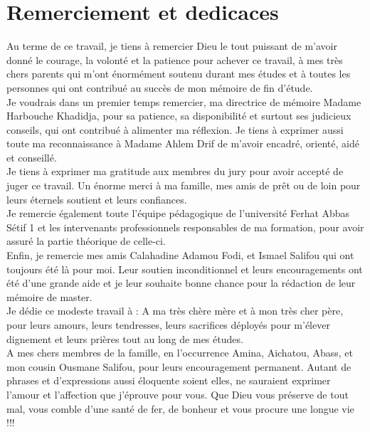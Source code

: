 \chapter*{Remerciement et dedicaces}
Au terme de ce travail, je tiens à remercier Dieu le tout puissant de m’avoir donné le courage, la volonté et la patience pour achever ce travail, à mes très chers parents qui m’ont énormément soutenu durant mes études et à toutes les personnes qui ont contribué au succès de mon mémoire de fin d’étude. \\
Je voudrais dans un premier temps remercier, ma directrice de mémoire Madame Harbouche Khadidja, pour sa patience, sa disponibilité et surtout ses judicieux conseils, qui ont contribué à alimenter ma réflexion. Je tiens à exprimer aussi toute ma reconnaissance à Madame Ahlem Drif de m’avoir encadré, orienté, aidé et conseillé. \\
Je tiens à exprimer ma gratitude aux membres du jury pour avoir accepté de juger ce travail. Un énorme merci à ma famille, mes amis de prêt ou de loin pour leurs éternels soutient et leurs confiances. \\
Je remercie également toute l’équipe pédagogique de l’université Ferhat Abbas Sétif 1 et les intervenants professionnels responsables de ma formation, pour avoir assuré la partie théorique de celle-ci. \\
Enfin, je remercie mes amis Calahadine Adamou Fodi, et Ismael Salifou qui ont toujours été là pour moi. Leur soutien inconditionnel et leurs encouragements ont été d’une grande aide et je leur souhaite bonne chance pour la rédaction de leur mémoire de master. \\
Je dédie ce modeste travail à :
A ma très chère mère et à mon très cher père, pour leurs amours, leurs tendresses, leurs sacrifices déployés pour m’élever dignement et leurs prières tout au long de mes études. \\
A mes chers membres de la famille, en l’occurrence Amina, Aichatou, Abass, et mon cousin Ousmane Salifou, pour leurs encouragement permanent. Autant de phrases et d’expressions aussi éloquente soient elles, ne sauraient exprimer l’amour et l’affection que j’éprouve pour vous. Que Dieu vous préserve de tout mal, vous comble d’une santé de fer, de bonheur et vous procure une longue vie !!!